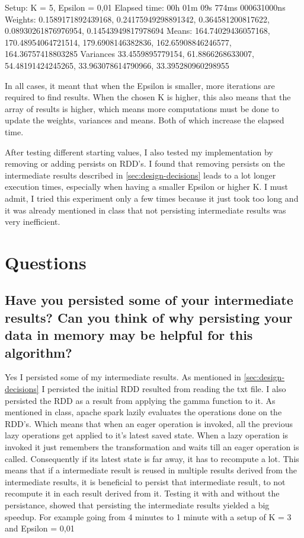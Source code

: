 \documentclass{article}
\begin{document}
Setup: K = 5, Epsilon = 0,01
Elapsed time: 00h 01m 09s 774ms 000631000ns
Weights: 0.1589171892439168, 0.24175949298891342, 0.364581200817622, 0.08930261876976954, 0.14543949817978694
Means:  164.74029436057168, 170.48954064721514, 179.6908146382836, 162.65908846246577, 164.36757418803285
Variances 33.4559895779154, 61.8866268633007, 54.48191424245265, 33.963078614790966, 33.395280960298955

In all cases, it meant that when the Epsilon is smaller, more iterations are required to find results.
When the chosen K is higher, this also means that the array of results is higher, which means more computations must be done to update the weights, variances and means. Both of which increase the elapsed time.

After testing different starting values, I also tested my implementation by removing or adding persists on RDD's. I found that removing persists on the intermediate results described in \ref{sec:design-decisions} leads to a lot longer execution times, especially when having a smaller Epsilon or higher K.
I must admit, I tried this experiment only a few times because it just took too long and it was already mentioned in class that not persisting intermediate results was very inefficient.
\section{Questions}
\subsection{Have you persisted some of your intermediate results? Can you think of why persisting
	your data in memory may be helpful for this algorithm?}
Yes I persisted some of my intermediate results.
As mentioned in \ref{sec:design-decisions} I persisted the initial RDD resulted from reading the txt file.
I also persisted the RDD as a result from applying the gamma function to it.
As mentioned in class, apache spark lazily evaluates the operations done on the RDD's.
Which means that when an eager operation is invoked, all the previous lazy operations get applied to it's latest saved state.
When a lazy operation is invoked it just remembers the transformation and waits till an eager operation is called.
Consequently if its latest state is far away, it has to recompute a lot. This means that if a intermediate result is reused in multiple results derived from the intermediate results, it is beneficial to persist that intermediate result, to not recompute it in each result derived from it. Testing it with and without the persistance, showed that persisting the intermediate results yielded a big speedup. For example going from 4 minutes to 1 minute with a setup of K = 3 and Epsilon = 0,01
\end{document}
